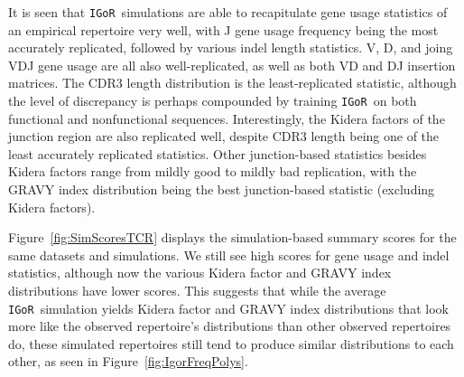 \documentclass{article}
\newcommand{\igor}{\texttt{IGoR}}
\begin{document}
It is seen that \igor\ simulations are able to recapitulate gene usage statistics of an empirical repertoire very well, with J gene usage frequency being the most accurately replicated, followed by various indel length statistics.
V, D, and joing VDJ gene usage are all also well-replicated, as well as both VD and DJ insertion matrices.
The CDR3 length distribution is the least-replicated statistic, although the level of discrepancy is perhaps compounded by training \igor\ on both functional and nonfunctional sequences.
Interestingly, the Kidera factors of the junction region are also replicated well, despite CDR3 length being one of the least accurately replicated statistics.
Other junction-based statistics besides Kidera factors range from mildly good to mildly bad replication, with the GRAVY index distribution being the best junction-based statistic (excluding Kidera factors).

Figure~\ref{fig:SimScoresTCR} displays the simulation-based summary scores for the same datasets and simulations.
We still see high scores for gene usage and indel statistics, although now the various Kidera factor and GRAVY index distributions have lower scores.
This suggests that while the average \igor\ simulation yields Kidera factor and GRAVY index distributions that look more like the observed repertoire's distributions than other observed repertoires do, these simulated repertoires still tend to produce similar distributions to each other, as seen in Figure~\ref{fig:IgorFreqPolys}.
\end{document}
